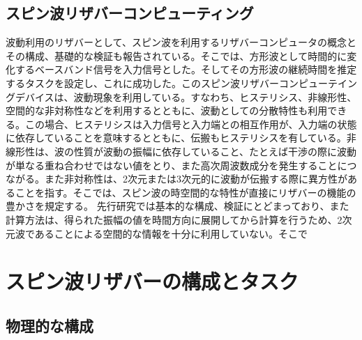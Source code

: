 \documentclass[a4j, twocolumn]{jsarticle}
\begin{document}
\subsection{スピン波リザバーコンピューティング}
波動利用のリザバーとして、スピン波を利用するリザバーコンピュータの概念とその構成、基礎的な検証も報告されている\cite{Nakane2018IEEEAccess:_Reser_Compu_with_spin_waves_Excit_in_a_Garne_film,Nakane2018ICM:_demon_of_spin_wave_based_reser_compu_for_next_gener_machi_learn_devic}。そこでは、方形波として時間的に変化するベースバンド信号を入力信号とした。そしてその方形波の継続時間を推定するタスクを設定し、これに成功した。このスピン波リザバーコンピューテイングデバイスは、波動現象を利用している。すなわち、ヒステリシス、非線形性、空間的な非対称性などを利用するとともに、波動としての分散特性も利用できる。この場合、ヒステリシスは入力信号と入力端との相互作用が、入力端の状態に依存していることを意味するとともに、伝搬もヒステリシスを有している。非線形性は、波の性質が波動の振幅に依存していること、たとえば干渉の際に波動が単なる重ね合わせではない値をとり、また高次周波数成分を発生することにつながる。また非対称性は、2次元または3次元的に波動が伝搬する際に異方性があることを指す。そこでは、スピン波の時空間的な特性が直接にリザバーの機能の豊かさを規定する。
先行研究\cite{Nakane2018IEEEAccess:_Reser_Compu_with_spin_waves_Excit_in_a_Garne_film}では基本的な構成、検証にとどまっており、また計算方法は、得られた振幅の値を時間方向に展開してから計算を行うため、2次元波であることによる空間的な情報を十分に利用していない。そこで

\section{スピン波リザバーの構成とタスク}%
\label{sec:constandtask}

\subsection{物理的な構成}
\label{subsec:const}
\end{document}
